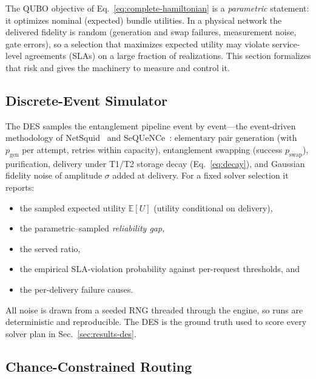 \documentclass[10pt,a4paper]{article}
\newcommand{\E}{\mathbb{E}}
\begin{document}
The QUBO objective of Eq.~\eqref{eq:complete-hamiltonian} is a
\emph{parametric} statement: it optimizes nominal (expected) bundle
utilities.  In a physical network the delivered fidelity is random
(generation and swap failures, measurement noise, gate errors), so a
selection that maximizes expected utility may violate service-level
agreements (SLAs) on a large fraction of realizations.  This section
formalizes that risk and gives the machinery to measure and control
it.

\subsection{Discrete-Event Simulator}
\label{sec:des}

The DES samples the entanglement pipeline event by event---the
event-driven methodology of NetSquid~\cite{coopmans2021netsquid} and
SeQUeNCe~\cite{wu2021sequence}: elementary
pair generation (with $p_{\text{gen}}$ per attempt, retries within
capacity), entanglement swapping (success $p_{\text{swap}}$),
purification, delivery under T1/T2 storage decay (Eq.~\eqref{eq:decay}),
and Gaussian fidelity noise of amplitude $\sigma$ added at delivery.
For a fixed solver selection it reports:
\begin{itemize}
  \item the sampled expected utility $\E[U]$ (utility conditional on
    delivery),
  \item the parametric--sampled \emph{reliability gap},
  \item the served ratio,
  \item the empirical SLA-violation probability against per-request
    thresholds, and
  \item the per-delivery failure causes.
\end{itemize}
All noise is drawn from a seeded RNG threaded through the engine, so
runs are deterministic and reproducible.  The DES is the ground truth
used to score every solver plan in Sec.~\ref{sec:results-des}.

\subsection{Chance-Constrained Routing}
\label{sec:chance-form}
\end{document}
